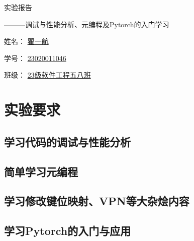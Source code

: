 \documentclass[UTF8,a4paper]{ctexart}
\begin{document}
\begin{sloppypar}
	
	\begin{center}
		\begin{fontsize}{80pt}{20pt}
			实验报告
		\end{fontsize}

		\bigskip
		\bigskip
		
		\begin{fontsize}{35pt}{20pt}
			\begin{flushright}
				———调试与性能分析、元编程及{\Huge Pytorch}的入门学习
			\end{flushright}
		\end{fontsize}
		
		\bigskip
		\bigskip
		\bigskip
		\bigskip
		\bigskip
		\bigskip
		\bigskip
		\bigskip
		\bigskip
		\bigskip
		\bigskip
		\bigskip
		\bigskip
		\bigskip
		\bigskip
		\bigskip
		\bigskip
		\bigskip
		\bigskip
		\bigskip
		\bigskip
		\bigskip
		
		\begin{fontsize}{25pt}{20pt}
			姓名：
			\underline{翟一航}
			
			\bigskip
			\bigskip
			\bigskip
			\bigskip
			
			学号：
			\underline{{\huge 23020011046}}
			
			\bigskip
			\bigskip
			\bigskip
			\bigskip
			
			班级：
			\underline{{\Huge 23}级软件工程五八班}
			
			
		\end{fontsize}
	\end{center}
	\section{实验要求}
	\subsection{学习代码的调试与性能分析}
	\subsection{简单学习元编程}
	\subsection{学习修改键位映射、VPN等大杂烩内容}
	\subsection{学习Pytorch的入门与应用}

\end{sloppypar}
\end{document}
